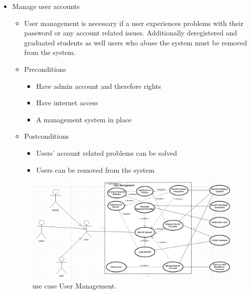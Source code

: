 \documentclass[12pt]{article}
\begin{document}
\begin{enumerate}
\begin{itemize}
				\item Manage user accounts
				\begin{itemize}
					\item User management is necessary if a user experiences problems with their password or any account related issues. Additionally deregistered and graduated students as well users who abuse the system must be removed from the system.
					\item Preconditions
					\begin{itemize}
						\item Have admin account and therefore rights
						\item Have internet access
						\item A management system in place
					\end{itemize}
					\item Postconditions
					\begin{itemize}
						\item Users’ account related problems can be solved
						\item Users can be removed from the system
					\end{itemize}
				\end{itemize}
				\begin{figure}
				    \includegraphics[width=\linewidth]{useCaseUserManagement.png}
				    \caption{use case User Management.}
  \label{fig:userManagement}
				\end{figure}
			\end{itemize}
			

\end{enumerate}
\end{document}
